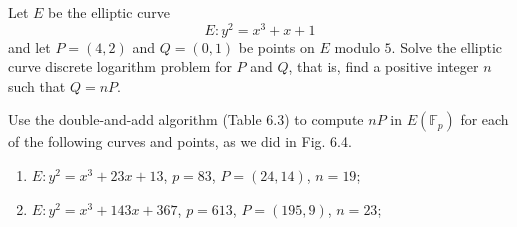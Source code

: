 \begin{exercise}{6.8}
    Let \( E \) be the elliptic curve
    \[
    E : y^2 = x^3 + x + 1
    \]
    and let \( P = (4, 2) \) and \( Q = (0, 1) \) be points on \( E \) modulo \( 5 \). Solve the elliptic curve discrete logarithm problem for \( P \) and \( Q \), that is, find a positive integer \( n \) such that \( Q = nP \).
\end{exercise}




\begin{exercise}{6.11}
    Use the double-and-add algorithm (Table 6.3) to compute \( nP \) in \( E(\mathbb{F}_p) \) for each of the following curves and points, as we did in Fig. 6.4.
    \begin{enumerate}
        \item \( E : y^2 = x^3 + 23x + 13 \), \( p = 83 \), \( P = (24, 14) \), \( n = 19 \);
        \item \( E : y^2 = x^3 + 143x + 367 \), \( p = 613 \), \( P = (195, 9) \), \( n = 23 \);
    \end{enumerate}
\end{exercise}

